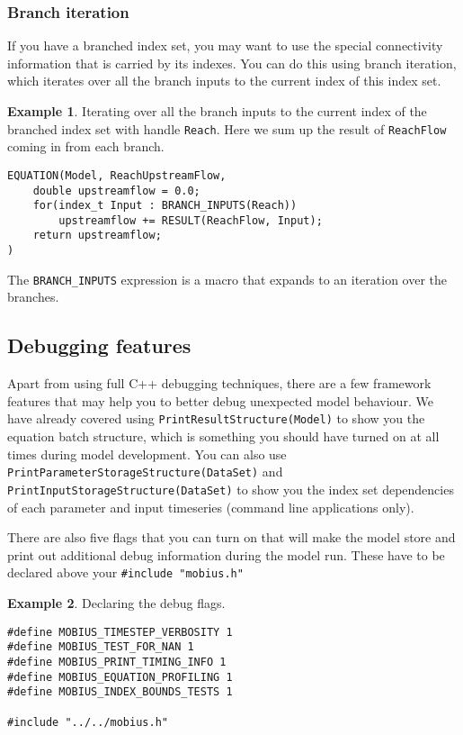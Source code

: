 \documentclass[11pt]{article}
\theoremstyle{definition}
\newtheorem{myexample}{Example}
\newenvironment{example}%
  {\begin{lrbox}{\examplebox}%
   \begin{minipage}{\dimexpr\linewidth-2\fboxsep}
   \begin{myexample}}%
  {\end{myexample}%
   \end{minipage}%
   \end{lrbox}%
   \begin{trivlist}
     \item[]\colorbox{silver}{\usebox\examplebox}
   \end{trivlist}}
\begin{document}
\subsubsection{Branch iteration}

If you have a branched index set, you may want to use the special connectivity information that is carried by its indexes. You can do this using branch iteration, which iterates over all the branch inputs to the current index of this index set.

\begin{example}
Iterating over all the branch inputs to the current index of the branched index set with handle {\tt Reach}. Here we sum up the result of {\tt ReachFlow} coming in from each branch.
\begin{lstlisting}[style=mycpp]
EQUATION(Model, ReachUpstreamFlow,
	double upstreamflow = 0.0;
	for(index_t Input : BRANCH_INPUTS(Reach))
		upstreamflow += RESULT(ReachFlow, Input);
	return upstreamflow;
)
\end{lstlisting}
\end{example}

The {\tt BRANCH\_INPUTS} expression is a macro that expands to an iteration over the branches.

\subsection{Debugging features}

Apart from using full C++ debugging techniques, there are a few framework features that may help you to better debug unexpected model behaviour. We have already covered using {\tt PrintResultStructure(Model)} to show you the equation batch structure, which is something you should have turned on at all times during model development. You can also use {\tt PrintParameterStorageStructure(DataSet)} and {\tt PrintInputStorageStructure(DataSet)} to show you the index set dependencies of each parameter and input timeseries (command line applications only).

There are also five flags that you can turn on that will make the model store and print out additional debug information during the model run. These have to be declared above your {\tt \#include "mobius.h"}

\begin{example}
Declaring the debug flags.
\begin{lstlisting}[style=mycpp]
#define MOBIUS_TIMESTEP_VERBOSITY 1
#define MOBIUS_TEST_FOR_NAN 1
#define MOBIUS_PRINT_TIMING_INFO 1
#define MOBIUS_EQUATION_PROFILING 1
#define MOBIUS_INDEX_BOUNDS_TESTS 1

#include "../../mobius.h"
\end{lstlisting}
\end{example}
\end{document}

